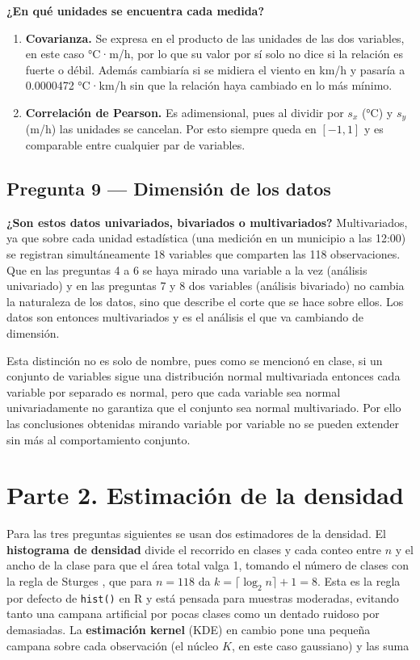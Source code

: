 \documentclass[oneside, openany, fontset=libertinus]{mitthesis}
\providecommand{\tightlist}{\setlength{\itemsep}{0pt}\setlength{\parskip}{0pt}}
\begin{document}
\textbf{¿En qué unidades se encuentra cada medida?}

\begin{enumerate}
\def\labelenumi{\alph{enumi}.}
\tightlist
\item
  \textbf{Covarianza.} Se expresa en el producto de las unidades de las
  dos variables, en este caso °C·m/h, por lo que su valor por sí solo no
  dice si la relación es fuerte o débil. Además cambiaría si se midiera
  el viento en km/h y pasaría a 0.0000472 °C·km/h sin que la relación
  haya cambiado en lo más mínimo.
\item
  \textbf{Correlación de Pearson.} Es adimensional, pues al dividir por
  \(s_x\) (°C) y \(s_y\) (m/h) las unidades se cancelan. Por esto
  siempre queda en \([-1, 1]\) y es comparable entre cualquier par de
  variables.
\end{enumerate}

\section{Pregunta 9 --- Dimensión de los datos}\label{p9}

\textbf{¿Son estos datos univariados, bivariados o multivariados?}
Multivariados, ya que sobre cada unidad estadística (una medición en un
municipio a las 12:00) se registran simultáneamente 18 variables que
comparten las 118 observaciones. Que en las preguntas 4 a 6 se haya
mirado una variable a la vez (análisis univariado) y en las preguntas 7
y 8 dos variables (análisis bivariado) no cambia la naturaleza de los
datos, sino que describe el corte que se hace sobre ellos. Los datos son
entonces multivariados y es el análisis el que va cambiando de
dimensión.

Esta distinción no es solo de nombre, pues como se mencionó en clase, si
un conjunto de variables sigue una distribución normal multivariada
entonces cada variable por separado es normal, pero que cada variable
sea normal univariadamente no garantiza que el conjunto sea normal
multivariado. Por ello las conclusiones obtenidas mirando variable por
variable no se pueden extender sin más al comportamiento conjunto.

\chapter{Parte 2. Estimación de la densidad}\label{parte2}

Para las tres preguntas siguientes se usan dos estimadores de la
densidad. El \textbf{histograma de densidad} divide el recorrido en
clases y cada conteo entre \(n\) y el ancho de la clase para que el área
total valga 1, tomando el número de clases con la regla de Sturges
\parencite{sturges1926}, que para \(n = 118\) da
\(k = \lceil \log_2 n \rceil + 1 = 8\). Esta es la regla por defecto de
\texttt{hist()} en R y está pensada para muestras moderadas, evitando
tanto una campana artificial por pocas clases como un dentado ruidoso
por demasiadas. La \textbf{estimación kernel} (KDE) en cambio pone una
pequeña campana sobre cada observación (el núcleo \(K\), en este caso
gaussiano) y las suma
\end{document}
